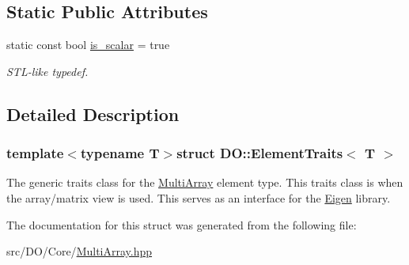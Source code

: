 \subsection*{Static Public Attributes}
\begin{DoxyCompactItemize}
\item 
\hypertarget{struct_d_o_1_1_element_traits_a083611162fed7f6427026ec1d5cd6678}{static const bool \hyperlink{struct_d_o_1_1_element_traits_a083611162fed7f6427026ec1d5cd6678}{is\-\_\-scalar} = true}\label{struct_d_o_1_1_element_traits_a083611162fed7f6427026ec1d5cd6678}

\begin{DoxyCompactList}\small\item\em S\-T\-L-\/like typedef. \end{DoxyCompactList}\end{DoxyCompactItemize}


\subsection{Detailed Description}
\subsubsection*{template$<$typename T$>$struct D\-O\-::\-Element\-Traits$<$ T $>$}

The generic traits class for the \hyperlink{class_d_o_1_1_multi_array}{Multi\-Array} element type. This traits class is when the array/matrix view is used. This serves as an interface for the \hyperlink{namespace_eigen}{Eigen} library. 

The documentation for this struct was generated from the following file\-:\begin{DoxyCompactItemize}
\item 
src/\-D\-O/\-Core/\hyperlink{_multi_array_8hpp}{Multi\-Array.\-hpp}\end{DoxyCompactItemize}
